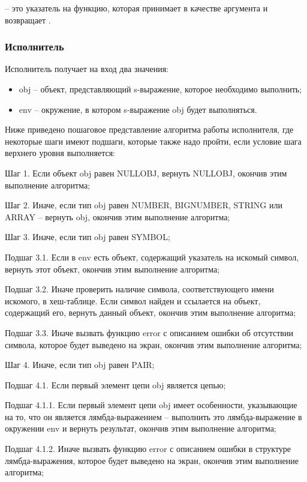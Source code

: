  -- это указатель на функцию, которая принимает  в качестве аргумента и возвращает .

\subsubsection{Исполнитель}

Исполнитель получает на вход два значения:
\begin{itemize}
\item obj -- объект, представляющий s-выражение, которое необходимо выполнить;
\item env -- окружение, в котором s-выражение obj будет выполняться.
\end{itemize}

Ниже приведено пошаговое представление алгоритма работы исполнителя, где некоторые шаги имеют подшаги, которые также надо пройти, если условие шага верхнего уровня выполняется:

Шаг 1. Если объект obj равен NULLOBJ, вернуть NULLOBJ, окончив этим выполнение алгоритма;

Шаг 2. Иначе, если тип obj равен NUMBER, BIGNUMBER, STRING или ARRAY -- вернуть obj, окончив этим выполнение алгоритма;

Шаг 3. Иначе, если тип obj равен SYMBOL;

Подшаг 3.1. Если в env есть объект, содержащий указатель на искомый символ, вернуть этот объект, окончив этим выполнение алгоритма;

Подшаг 3.2. Иначе проверить наличие символа, соответствующего имени искомого, в хеш-таблице. Если символ найден и ссылается на объект, содержащий его, вернуть данный объект, окончив этим выполнение алгоритма;

Подшаг 3.3. Иначе вызвать функцию error с описанием ошибки об отсутствии символа, которое будет выведено на экран, окончив этим выполнение алгоритма;

Шаг 4. Иначе, если тип obj равен PAIR;

Подшаг 4.1. Если первый элемент цепи obj является цепью;

Подшаг 4.1.1. Если первый элемент цепи obj имеет особенности, указывающие на то, что он является лямбда-выражением -- выполнить это лямбда-выражение в окружении env и вернуть результат, окончив этим выполнение алгоритма;

Подшаг 4.1.2. Иначе вызвать функцию error с описанием ошибки в структуре лямбда-выражения, которое будет выведено на экран, окончив этим выполнение алгоритма;

